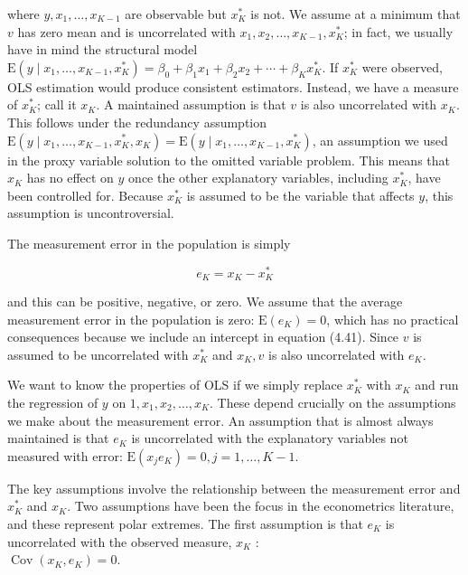 \documentclass[10pt]{article}
\begin{document}
where $y, x_{1}, \ldots, x_{K-1}$ are observable but $x_{K}^{*}$ is not. We assume at a minimum that $v$ has zero mean and is uncorrelated with $x_{1}, x_{2}, \ldots, x_{K-1}, x_{K}^{*}$; in fact, we usually have in mind the structural model $\mathrm{E}\left(y \mid x_{1}, \ldots, x_{K-1}, x_{K}^{*}\right)=\beta_{0}+\beta_{1} x_{1}+\beta_{2} x_{2}+\cdots+ \beta_{K} x_{K}^{*}$. If $x_{K}^{*}$ were observed, OLS estimation would produce consistent estimators. Instead, we have a measure of $x_{K}^{*}$; call it $x_{K}$. A maintained assumption is that $v$ is also uncorrelated with $x_{K}$. This follows under the redundancy assumption $\mathrm{E}\left(y \mid x_{1}, \ldots, x_{K-1}, x_{K}^{*}, x_{K}\right)=\mathrm{E}\left(y \mid x_{1}, \ldots, x_{K-1}, x_{K}^{*}\right)$, an assumption we used in the proxy variable solution to the omitted variable problem. This means that $x_{K}$ has no effect on $y$ once the other explanatory variables, including $x_{K}^{*}$, have been controlled for. Because $x_{K}^{*}$ is assumed to be the variable that affects $y$, this assumption is uncontroversial.

The measurement error in the population is simply


\begin{equation*}
e_{K}=x_{K}-x_{K}^{*} \tag{4.42}
\end{equation*}


and this can be positive, negative, or zero. We assume that the average measurement error in the population is zero: $\mathrm{E}\left(e_{K}\right)=0$, which has no practical consequences because we include an intercept in equation (4.41). Since $v$ is assumed to be uncorrelated with $x_{K}^{*}$ and $x_{K}, v$ is also uncorrelated with $e_{K}$.

We want to know the properties of OLS if we simply replace $x_{K}^{*}$ with $x_{K}$ and run the regression of $y$ on $1, x_{1}, x_{2}, \ldots, x_{K}$. These depend crucially on the assumptions we make about the measurement error. An assumption that is almost always maintained is that $e_{K}$ is uncorrelated with the explanatory variables not measured with error: $\mathrm{E}\left(x_{j} e_{K}\right)=0, j=1, \ldots, K-1$.

The key assumptions involve the relationship between the measurement error and $x_{K}^{*}$ and $x_{K}$. Two assumptions have been the focus in the econometrics literature, and these represent polar extremes. The first assumption is that $e_{K}$ is uncorrelated with the observed measure, $x_{K}$ :\\
$\operatorname{Cov}\left(x_{K}, e_{K}\right)=0$.
\end{document}

